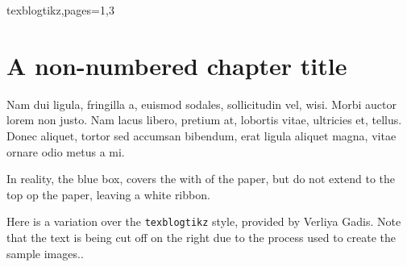 \begin{showchapterstyle*}{texblogtikz,pages={1,3}}
\chapter*{A non-numbered chapter title}
Nam dui ligula, fringilla a, euismod sodales, sollicitudin vel,
wisi. Morbi auctor lorem non justo. Nam lacus libero, pretium at,
lobortis vitae, ultricies et, tellus. Donec aliquet, tortor sed
accumsan bibendum, erat ligula aliquet magna, vitae ornare odio metus
a mi.  


\end{showchapterstyle*}

In reality, the blue box, covers the with of the paper, but do not
extend to the top op the paper, leaving a white ribbon.



Here is a variation over the \texttt{texblogtikz} style, provided by
Verliya Gadis. Note that the text is being cut off on the right due to
the process used to create the sample images..

\begingroup


